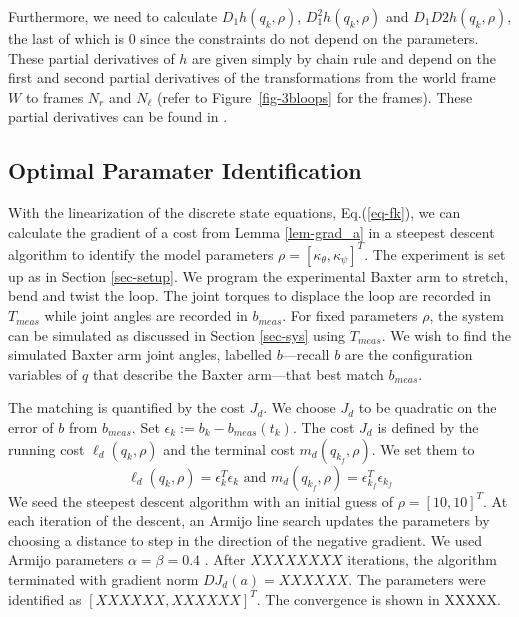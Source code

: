 \documentclass[letterpaper, 10pt, conference]{ieeeconf}
\begin{document}
Furthermore, we need to calculate $D_1h(q_k,\rho)$, $D_1^2h(q_k,\rho)$ and $D_1D2h(q_k,\rho)$, the last of which is $0$ since the constraints do not depend on the parameters.  These partial derivatives of $h$ are given simply by chain rule and depend on the first and second partial derivatives of the transformations from the world frame $W$ to frames $N_r$ and $N_\ell$ (refer to Figure~\ref{fig-3bloops} for the frames).  These partial derivatives can be found in \cite{johnson_murphey_linearization}.  

\subsection{Optimal Paramater Identification}

With the linearization of the discrete state equations, Eq.(\ref{eq-fk}), we can calculate the gradient of a cost from Lemma \ref{lem-grad_a} in a steepest descent algorithm to identify the model parameters $\rho = [\kappa_\theta,\kappa_\psi]^T$.  The experiment is set up as in Section \ref{sec-setup}.  We program the experimental Baxter arm to stretch, bend and twist the loop.  The joint torques to displace the loop are recorded in $T_{meas}$ while joint angles are recorded in $b_{meas}$.    For fixed parameters $\rho$, the system can be simulated as discussed in Section \ref{sec-sys} using $T_{meas}$.  We wish to find the simulated Baxter arm joint angles, labelled $b$---recall $b$ are the configuration variables of $q$ that describe the Baxter arm---that best match $b_{meas}$.

The matching is quantified by the cost $J_d$.  We choose $J_d$ to be quadratic on the error of $b$ from $b_{meas}$.   Set $\epsilon_k := b_k-b_{meas}(t_k)$.  The cost $J_d$ is defined by the running cost $\ell_d(q_k,\rho)$ and the terminal cost $m_d(q_{k_f},\rho)$.  We set them to
\[
\ell_d(q_k,\rho) = \epsilon_k^T\epsilon_k \textrm{ and } m_d(q_{k_f},\rho) = \epsilon_{k_f}^T\epsilon_{k_f}
\]
We seed the steepest descent algorithm with an initial guess of $\rho = [10, 10]^T$.  At each iteration of the descent, an Armijo line search updates the parameters by choosing a distance to step in the direction of the negative gradient.  We used Armijo parameters $\alpha = \beta = 0.4$ \cite{armijo}.  After $XXXXXXXX$ iterations, the algorithm terminated with gradient norm $DJ_d(a) = XXXXXX$.  The parameters were identified as $[XXXXXX,XXXXXX]^T$.  The convergence is shown in XXXXX.%
\end{document}
